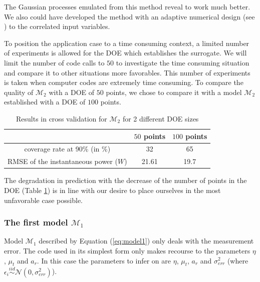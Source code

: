 \documentclass[soumission]{jsfds}
\begin{document}
The Gaussian processes emulated from this method reveal to work much better. We also could have developed the method with an adaptive numerical design (see \citep{damblin2018}) to the correlated input variables. \newline

To position the application case to a time consuming context, a limited number of experiments is allowed for the DOE which establishes the surrogate. We will limit the number of code calls to $50$ to investigate the time consuming situation and compare it to other situations more favorables. This number of experiments is taken when computer codes are extremely time consuming. To compare the quality of $\mathcal{M}_2$ with a DOE of $50$ points, we chose to compare it with a model $\mathcal{M}_2$ established with a DOE of $100$ points. \newline

\begin{table}[htbp!]
\centering
\caption{Results in cross validation for $\mathcal{M}_2$ for 2 different DOE sizes}
\label{tab:comparisonPG}
\begin{tabular}{c|c|c}

& $50$ points & $100$ points\\
\hline
\hline
coverage rate at 90\% (in \%) & 32 & 65 \\
\hline
RMSE of the instantaneous power ($W$) &21.61 &19.7 \\
\end{tabular}
\end{table}

The degradation in prediction with the decrease of the number of points in the DOE (Table \ref{tab:comparisonPG}) is in line with our desire to place ourselves in the most unfavorable case possible.


%

\subsubsection{The first model $\mathcal{M}_1$}

Model $\mathcal{M}_1$ described by Equation (\ref{eq:model1}) only deals with the measurement error. The code used in its simplest form only makes recourse to the parameters $\eta$, $\mu_t$ and $a_r$. In this case the parameters to infer on are $\eta$, $\mu_t$, $a_r$ and $\sigma_{err}^2$ (where $\epsilon_i\overset{iid}{\sim}\mathcal{N}(0,\sigma_{err}^2)$).
\end{document}
